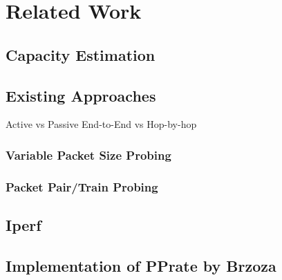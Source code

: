 \chapter{Related Work}

\section{Capacity Estimation}

\section{Existing Approaches}
Active vs Passive
End-to-End vs Hop-by-hop

\subsection*{Variable Packet Size Probing}

\subsection*{Packet Pair/Train Probing}

\section{Iperf}

\section{Implementation of PPrate by Brzoza}
